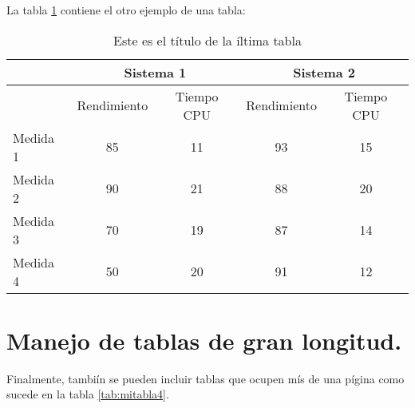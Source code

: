 La tabla \ref{tab:mitabla3} contiene el otro ejemplo de una tabla:

\begin{table}[H]
\begin{center}
    \begin{tabular}{|l|c|c|c|c|}
        \hline
         & \multicolumn{2}{|c|}{\textbf{Sistema 1}} & \multicolumn{2}{|c|}{\textbf{Sistema 2}}\\
        \hline
         & Rendimiento & Tiempo CPU & Rendimiento & Tiempo CPU\\
        \hline
        \hline
        Medida 1 & 85 & 11 & 93 & 15\\
        Medida 2 & 90 & 21 & 88 & 20\\
        Medida 3 & 70 & 19 & 87 & 14\\
        Medida 4 & 50 & 20 & 91 & 12\\
        \hline
    \end{tabular}
    \caption{Este es el título de la íltima tabla}
    \label{tab:mitabla3}
\end{center}
\end{table}

\section{Manejo de tablas de gran longitud.}

Finalmente, tambiín se pueden incluir tablas que ocupen mís de una pígina como sucede en la tabla \ref{tab:mitabla4}.

